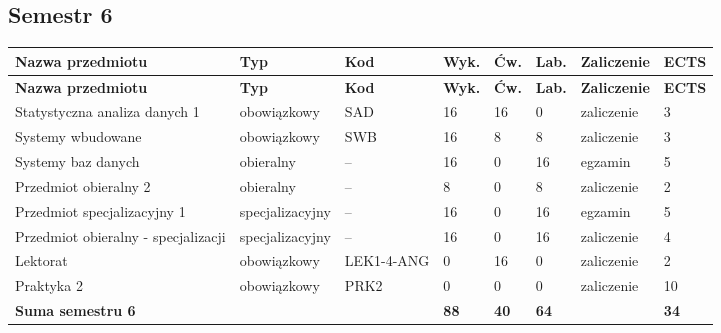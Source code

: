 \documentclass[12pt,a4paper]{article}
\newcommand{\thdrule}{\noalign{\global\setlength{\extrarowheight}{0pt}}}
\newcommand{\thdend}{\noalign{\global\setlength{\extrarowheight}{4pt}}}
\begin{document}
\subsection*{Semestr 6}

{\scriptsize
\begin{longtable}{>{\RaggedRight}m{5.0cm}m{1.9cm}m{0.75cm}m{0.85cm}m{0.85cm}m{0.85cm}m{1.45cm}m{0.9cm}}
\thdrule\toprule
\rowcolor{pjatkRed}
{\color{white}\footnotesize\textbf{\vphantom{Ag}Nazwa przedmiotu}} & {\color{white}\footnotesize\textbf{\vphantom{Ag}Typ}} & {\color{white}\footnotesize\textbf{\vphantom{Ag}Kod}} & {\color{white}\footnotesize\textbf{\vphantom{Ag}Wyk.}} & {\color{white}\footnotesize\textbf{\vphantom{Ag}Ćw.}} & {\color{white}\footnotesize\textbf{\vphantom{Ag}Lab.}} & {\color{white}\footnotesize\textbf{\vphantom{Ag}Zaliczenie}} & {\color{white}\footnotesize\textbf{\vphantom{Ag}ECTS}} \\
\midrule\thdend
\endfirsthead
\thdrule\toprule
\rowcolor{pjatkRed}
{\color{white}\footnotesize\textbf{\vphantom{Ag}Nazwa przedmiotu}} & {\color{white}\footnotesize\textbf{\vphantom{Ag}Typ}} & {\color{white}\footnotesize\textbf{\vphantom{Ag}Kod}} & {\color{white}\footnotesize\textbf{\vphantom{Ag}Wyk.}} & {\color{white}\footnotesize\textbf{\vphantom{Ag}Ćw.}} & {\color{white}\footnotesize\textbf{\vphantom{Ag}Lab.}} & {\color{white}\footnotesize\textbf{\vphantom{Ag}Zaliczenie}} & {\color{white}\footnotesize\textbf{\vphantom{Ag}ECTS}} \\
\midrule\thdend
\endhead
\rowcolor{tableRowLight} Statystyczna analiza danych 1 & {\scriptsize obowiązkowy} & SAD & 16 & 16 & 0 & {\scriptsize zaliczenie} & 3 \\
\rowcolor{tableRowAlt} Systemy wbudowane & {\scriptsize obowiązkowy} & SWB & 16 & 8 & 8 & {\scriptsize zaliczenie} & 3 \\
\rowcolor{tableElective} Systemy baz danych & {\scriptsize obieralny} & -- & 16 & 0 & 16 & {\scriptsize egzamin} & 5 \\
\rowcolor{tableElective} Przedmiot obieralny 2 & {\scriptsize obieralny} & -- & 8 & 0 & 8 & {\scriptsize zaliczenie} & 2 \\
\rowcolor{tableElective} Przedmiot specjalizacyjny 1 & {\scriptsize specjalizacyjny} & -- & 16 & 0 & 16 & {\scriptsize egzamin} & 5 \\
\rowcolor{tableElective} Przedmiot obieralny - specjalizacji & {\scriptsize specjalizacyjny} & -- & 16 & 0 & 16 & {\scriptsize zaliczenie} & 4 \\
\rowcolor{tableRowLight} Lektorat & {\scriptsize obowiązkowy} & LEK1-4-ANG & 0 & 16 & 0 & {\scriptsize zaliczenie} & 2 \\
\rowcolor{tableRowAlt} Praktyka 2 & {\scriptsize obowiązkowy} & PRK2 & 0 & 0 & 0 & {\scriptsize zaliczenie} & 10 \\
\midrule[\heavyrulewidth]
\rowcolor{tableSummary} \textbf{Suma semestru 6} & & & \textbf{88} & \textbf{40} & \textbf{64} & & \textbf{34} \\
\bottomrule
\end{longtable}}
\end{document}
